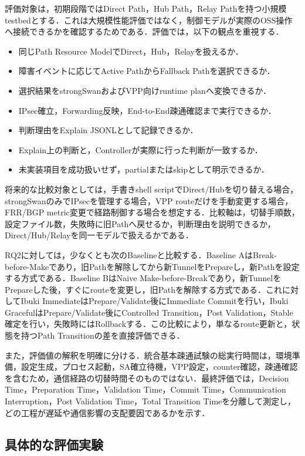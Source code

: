 \documentclass[11pt,a4paper,twoside]{ltjsarticle}
\begin{document}
評価対象は，初期段階ではDirect Path，Hub Path，Relay Pathを持つ小規模testbedとする．これは大規模性能評価ではなく，制御モデルが実際のOSS操作へ接続できるかを確認するためである．評価では，以下の観点を重視する．

\begin{itemize}[leftmargin=*]
\item 同じPath Resource ModelでDirect，Hub，Relayを扱えるか．
\item 障害イベントに応じてActive PathからFallback Pathを選択できるか．
\item 選択結果をstrongSwanおよびVPP向けruntime planへ変換できるか．
\item IPsec確立，Forwarding反映，End-to-End疎通確認まで実行できるか．
\item 判断理由をExplain JSONLとして記録できるか．
\item Explain上の判断と，Controllerが実際に行った判断が一致するか．
\item 未実装項目を成功扱いせず，partialまたはskipとして明示できるか．
\end{itemize}

将来的な比較対象としては，手書きshell scriptでDirect/Hubを切り替える場合，strongSwanのみでIPsecを管理する場合，VPP routeだけを手動変更する場合，FRR/BGP metric変更で経路制御する場合を想定する．比較軸は，切替手順数，設定ファイル数，失敗時に旧Pathへ戻せるか，判断理由を説明できるか，Direct/Hub/Relayを同一モデルで扱えるかである．

RQ2に対しては，少なくとも次のBaselineと比較する．Baseline AはBreak-before-Makeであり，旧Pathを解除してから新TunnelをPrepareし，新Pathを設定する方式である．Baseline BはNaive Make-before-Breakであり，新TunnelをPrepareした後，すぐにrouteを変更し，旧Pathを解除する方式である．これに対してIbuki ImmediateはPrepare/Validate後にImmediate Commitを行い，Ibuki GracefulはPrepare/Validate後にControlled Transition，Post Validation，Stable確定を行い，失敗時にはRollbackする．この比較により，単なるroute更新と，状態を持つPath Transitionの差を直接評価できる．

また，評価値の解釈を明確に分ける．統合基本疎通試験の総実行時間は，環境準備，設定生成，プロセス起動，SA確立待機，VPP設定，counter確認，疎通確認を含むため，通信経路の切替時間そのものではない．最終評価では，Decision Time，Preparation Time，Validation Time，Commit Time，Communication Interruption，Post Validation Time，Total Transition Timeを分離して測定し，どの工程が遅延や通信影響の支配要因であるかを示す．


\subsection{具体的な評価実験}
\end{document}
